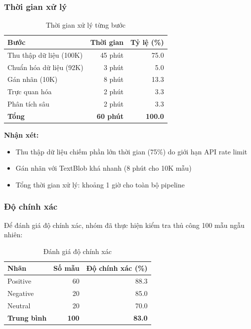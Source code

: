 \subsubsection{Thời gian xử lý}
\begin{table}[H]
\centering
\caption{Thời gian xử lý từng bước}
\begin{tabular}{|l|r|r|}
\hline
\textbf{Bước} & \textbf{Thời gian} & \textbf{Tỷ lệ (\%)} \\
\hline
Thu thập dữ liệu (100K) & 45 phút & 75.0 \\
\hline
Chuẩn hóa dữ liệu (92K) & 3 phút & 5.0 \\
\hline
Gán nhãn (10K) & 8 phút & 13.3 \\
\hline
Trực quan hóa & 2 phút & 3.3 \\
\hline
Phân tích sâu & 2 phút & 3.3 \\
\hline
\textbf{Tổng} & \textbf{60 phút} & \textbf{100.0} \\
\hline
\end{tabular}
\end{table}

\textbf{Nhận xét:}
\begin{itemize}
    \item Thu thập dữ liệu chiếm phần lớn thời gian (75\%) do giới hạn API rate limit
    \item Gán nhãn với TextBlob khá nhanh (8 phút cho 10K mẫu)
    \item Tổng thời gian xử lý: khoảng 1 giờ cho toàn bộ pipeline
\end{itemize}

\subsubsection{Độ chính xác}
Để đánh giá độ chính xác, nhóm đã thực hiện kiểm tra thủ công 100 mẫu ngẫu nhiên:

\begin{table}[H]
\centering
\caption{Đánh giá độ chính xác}
\begin{tabular}{|l|r|r|}
\hline
\textbf{Nhãn} & \textbf{Số mẫu} & \textbf{Độ chính xác (\%)} \\
\hline
Positive & 60 & 88.3 \\
\hline
Negative & 20 & 85.0 \\
\hline
Neutral & 20 & 70.0 \\
\hline
\textbf{Trung bình} & \textbf{100} & \textbf{83.0} \\
\hline
\end{tabular}
\end{table}

